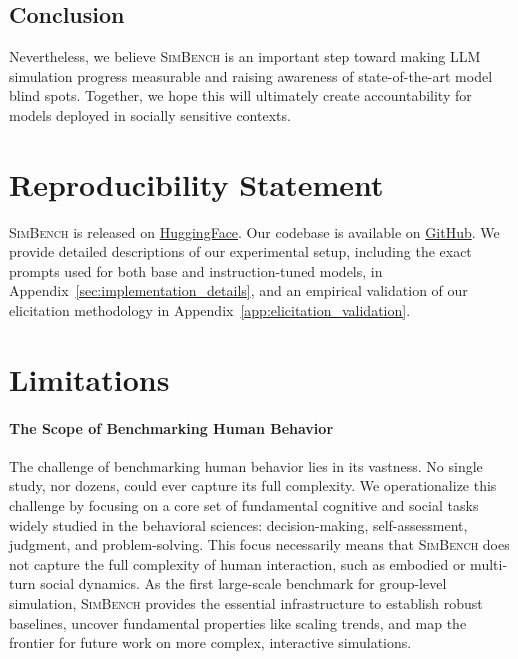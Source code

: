 \documentclass{article} %
\begin{document}
\subsection*{Conclusion}
Nevertheless, we believe \textsc{SimBench} is an important step toward making LLM simulation progress measurable and raising awareness of state-of-the-art model blind spots. Together, we hope this will ultimately create accountability for models deployed in socially sensitive contexts.

\section*{Reproducibility Statement}
\textsc{SimBench} is released on \href{https://huggingface.co/datasets/pitehu/SimBench}{HuggingFace}. Our codebase is available on \href{https://github.com/pitehu/SimBench_release/}{GitHub}. We provide detailed descriptions of our experimental setup, including the exact prompts used for both base and instruction-tuned models, in Appendix~\ref{sec:implementation_details}, and an empirical validation of our elicitation methodology in Appendix~\ref{app:elicitation_validation}.


\newpage





\newpage
\appendix


\section{Limitations}
\label{limitations}



\paragraph{The Scope of Benchmarking Human Behavior}
The challenge of benchmarking human behavior lies in its vastness. No single study, nor dozens, could ever capture its full complexity. We operationalize this challenge by focusing on a core set of fundamental cognitive and social tasks widely studied in the behavioral sciences: decision-making, self-assessment, judgment, and problem-solving. This focus necessarily means that \textsc{SimBench} does not capture the full complexity of human interaction, such as embodied or multi-turn social dynamics. As the first large-scale benchmark for group-level simulation, \textsc{SimBench} provides the essential infrastructure to establish robust baselines, uncover fundamental properties like scaling trends, and map the frontier for future work on more complex, interactive simulations.
\end{document}

